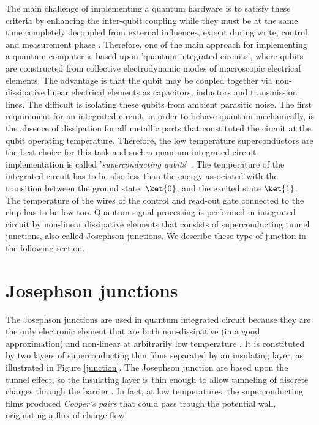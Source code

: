 The main challenge of implementing a quantum hardware is to satisfy these criteria by enhancing the inter-qubit coupling while they must be at the same time completely decoupled from external influences, except during write, control and measurement phase \cite{Hardware} . Therefore, one of the main approach for implementing a quantum computer is based upon 'quantum integrated circuits', where qubits are constructed from collective electrodynamic modes of macroscopic electrical elements. The advantage is that the qubit may be coupled together via non-dissipative linear electrical elements as capacitors, inductors and transmission lines. The difficult is isolating these qubits from ambient parasitic noise. 
The first requirement for an integrated circuit, in order to behave quantum mechanically, is the absence of dissipation for all metallic parts that constituted the circuit at the qubit operating temperature. Therefore, the low temperature superconductors are the best choice for this task and such a quantum integrated circuit implementation is called '\textit{superconducting qubits}' \cite{Hardware}. The temperature of the integrated circuit has to be also less than the energy associated with the transition between the ground state, $\ket{0}$, and the excited state $\ket{1}$.%
The temperature of the wires of the control and read-out gate connected to the chip has to be low too. Quantum signal processing is performed in integrated circuit by non-linear dissipative elements that consists of superconducting tunnel junctions, also called Josephson junctions. We describe these type of junction in the following section.


\section{Josephson junctions}
The Josephson junctions are used in quantum integrated circuit because they are the only electronic element that are both non-dissipative (in a good approximation) and non-linear at arbitrarily low temperature \cite{Hardware}. 
It is constituted by two layers of superconducting thin films separated by an insulating layer, as illustrated in Figure \ref{junction}. The Josephson junction are based upon the tunnel effect, so the insulating layer is thin enough to allow tunneling of discrete charges through the barrier \cite{Hardware2}. In fact, at low temperatures, the superconducting films produced \textit{Cooper's pairs} that could pass trough the potential wall, originating a flux of charge flow.


